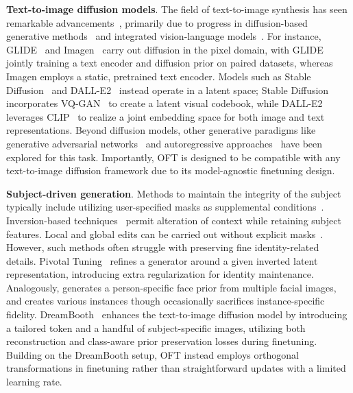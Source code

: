 \textbf{Text-to-image diffusion models}. The field of text-to-image synthesis has seen remarkable advancements~\cite{saharia2022photorealistic,ramesh2022hierarchical,rombach2022high,gu2022vector,nichol2022glide}, primarily due to progress in diffusion-based generative methods~\cite{ho2020denoising,song2021score,song2021denoising,dhariwal2021diffusion} and integrated vision-language models~\cite{su2020vlbert,lu2019vilbert,radford2021learning,wang2021simvlm,li2022blip,li2023blip,alayrac2022flamingo,schuhmann2022laion}. For instance, GLIDE~\cite{nichol2022glide} and Imagen~\cite{saharia2022photorealistic} carry out diffusion in the pixel domain, with GLIDE jointly training a text encoder and diffusion prior on paired datasets, whereas Imagen employs a static, pretrained text encoder. Models such as Stable Diffusion~\cite{rombach2022high} and DALL-E2~\cite{ramesh2022hierarchical} instead operate in a latent space; Stable Diffusion incorporates VQ-GAN~\cite{esser2021taming} to create a latent visual codebook, while DALL-E2 leverages CLIP~\cite{radford2021learning} to realize a joint embedding space for both image and text representations. Beyond diffusion models, other generative paradigms like generative adversarial networks~\cite{reed2016generative,zhang2017stackgan,xu2018attngan,li2019controllable} and autoregressive approaches~\cite{ramesh2021zero,ding2021cogview,wu2022nuwa,yuscaling} have been explored for this task. Importantly, OFT is designed to be compatible with any text-to-image diffusion framework due to its model-agnostic finetuning design.

\textbf{Subject-driven generation}. Methods to maintain the integrity of the subject typically include utilizing user-specified masks as supplemental conditions~\cite{avrahami2022blended,nichol2022glide}. Inversion-based techniques~\cite{choi2021ilvr,dhariwal2021diffusion,ramesh2022hierarchical,gal2022image} permit alteration of context while retaining subject features. Local and global edits can be carried out without explicit masks~\cite{hertz2022prompt}. However, such methods often struggle with preserving fine identity-related details. Pivotal Tuning~\cite{roich2022pivotal} refines a generator around a given inverted latent representation, introducing extra regularization for identity maintenance. Analogously, \cite{nitzan2022mystyle} generates a person-specific face prior from multiple facial images, and \cite{casanova2021instance} creates various instances though occasionally sacrifices instance-specific fidelity. DreamBooth~\cite{ruiz2023dreambooth} enhances the text-to-image diffusion model by introducing a tailored token and a handful of subject-specific images, utilizing both reconstruction and class-aware prior preservation losses during finetuning. Building on the DreamBooth setup, OFT instead employs orthogonal transformations in finetuning rather than straightforward updates with a limited learning rate.

